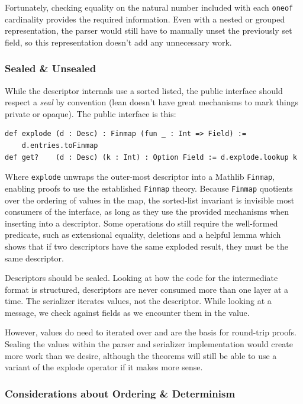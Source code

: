 Fortunately, checking equality on the natural number included with each
\texttt{oneof} cardinality provides the required information. Even with a nested
or grouped representation, the parser would still have to manually unset the
previously set field, so this representation doesn't add any unnecessary work.

\subsubsection{Sealed \& Unsealed}

While the descriptor internals use a sorted listed, the public interface should
respect a \emph{seal} by convention (lean doesn't have great mechanisms to mark
things private or opaque). The public interface is this: 

\begin{verbatim}
def explode (d : Desc) : Finmap (fun _ : Int => Field) :=
    d.entries.toFinmap
def get?    (d : Desc) (k : Int) : Option Field := d.explode.lookup k
\end{verbatim}

Where \texttt{explode} unwraps the outer-most descriptor into a Mathlib
\texttt{Finmap}, enabling proofs to use the established \texttt{Finmap}
theory. Because \texttt{Finmap} quotients over the ordering of values in the
map, the sorted-list invariant is invisible most consumers of the interface, as
long as they use the provided mechanisms when inserting into a descriptor. Some
operations do still require the well-formed predicate, such as extensional
equality, deletions and a helpful lemma which shows that if two descriptors have
the same exploded result, they must be the same descriptor.

Descriptors should be sealed. Looking at how the code for the intermediate
format is structured, descriptors are never consumed more than one layer at a
time. The serializer iterates values, not the descriptor. While looking at a
message, we check against fields as we encounter them in the value.

However, values do need to iterated over and are the basis for round-trip
proofs. Sealing the values within the parser and serializer implementation would
create more work than we desire, although the theorems will still be able to use
a variant of the explode operator if it makes more sense.

\subsubsection{Considerations about Ordering \& Determinism}


